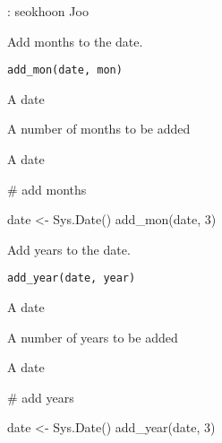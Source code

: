 \documentclass[letterpaper]{book}
\begin{document}
%
\begin{Author}
: seokhoon Joo 

\end{Author}
%
\begin{Description}
Add months to the date.
\end{Description}
%
\begin{Usage}
\begin{verbatim}
add_mon(date, mon)
\end{verbatim}
\end{Usage}
%
\begin{Arguments}
\begin{ldescription}
\item[\code{date}] A date

\item[\code{mon}] A number of months to be added
\end{ldescription}
\end{Arguments}
%
\begin{Value}
A date
\end{Value}
%
\begin{Examples}
\begin{ExampleCode}
# add months

date <- Sys.Date()
add_mon(date, 3)

\end{ExampleCode}
\end{Examples}
%
\begin{Description}
Add years to the date.
\end{Description}
%
\begin{Usage}
\begin{verbatim}
add_year(date, year)
\end{verbatim}
\end{Usage}
%
\begin{Arguments}
\begin{ldescription}
\item[\code{date}] A date

\item[\code{year}] A number of years to be added
\end{ldescription}
\end{Arguments}
%
\begin{Value}
A date
\end{Value}
%
\begin{Examples}
\begin{ExampleCode}
# add years

date <- Sys.Date()
add_year(date, 3)

\end{ExampleCode}
\end{Examples}
\end{document}
